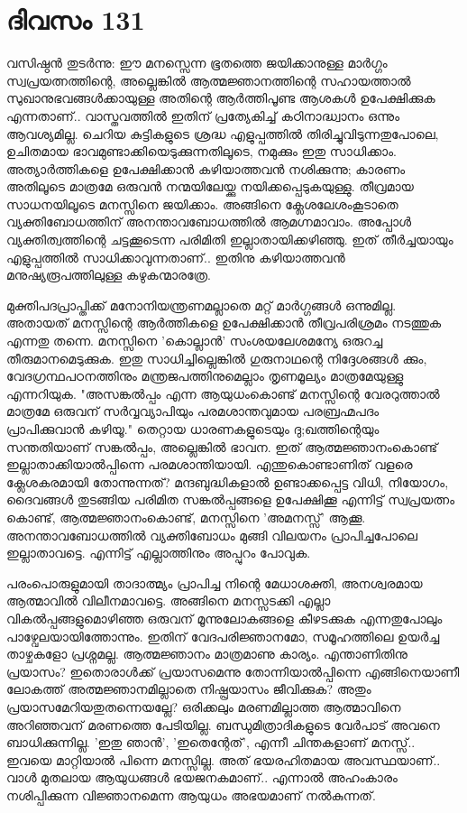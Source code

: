 \newpage
\section{ദിവസം 131}


വസിഷ്ഠന്‍ തുടര്‍ന്നു: ഈ മനസ്സെന്ന ഭൂതത്തെ ജയിക്കാനുള്ള മാര്‍ഗ്ഗം സ്വപ്രയത്നത്തിന്റെ, അല്ലെങ്കില്‍ ആത്മജ്ഞാനത്തിന്റെ സഹായത്താല്‍ സുഖാനുഭവങ്ങള്‍ക്കായുള്ള അതിന്റെ ആര്‍ത്തിപൂണ്ട  ആശകള്‍ ഉപേക്ഷിക്കുക എന്നതാണ്‌.. വാസ്തവത്തില്‍ ഇതിന്‌ പ്രത്യേകിച്ച്‌ കഠിനാദ്ധ്വാനം ഒന്നും ആവശ്യമില്ല. ചെറിയ കുട്ടികളുടെ ശ്രദ്ധ എളുപ്പത്തില്‍ തിരിച്ചുവിടുന്നതുപോലെ, ഉചിതമായ ഭാവമുണ്ടാക്കിയെടുക്കുന്നതിലൂടെ, നമുക്കും ഇതു സാധിക്കാം. അത്യാര്‍ത്തികളെ ഉപേക്ഷിക്കാന്‍ കഴിയാത്തവന്‍ നശിക്കുന്നു; കാരണം അതിലൂടെ മാത്രമേ ഒരുവന്‍ നന്മയിലേയ്ക്കു നയിക്കപ്പെടുകയുള്ളു. തീവ്രമായ സാധനയിലൂടെ മനസ്സിനെ ജയിക്കാം. അങ്ങിനെ ക്ലേശലേശംകൂടാതെ വ്യക്തിബോധത്തിന്‌ അനന്താവബോധത്തില്‍ ആമഗ്നമാവാം. അപ്പോള്‍ വ്യക്തിത്വത്തിന്റെ ചട്ടക്കൂടെന്ന പരിമിതി ഇല്ലാതായിക്കഴിഞ്ഞു. ഇത്‌ തീര്‍ച്ചയായും എളുപ്പത്തില്‍ സാധിക്കാവുന്നതാണ്‌.. ഇതിനു കഴിയാത്തവന്‍ മനുഷ്യരൂപത്തിലുള്ള കഴുകന്മാരത്രേ.

മുക്തിപദപ്രാപ്തിക്ക്‌ മനോനിയന്ത്രണമല്ലാതെ മറ്റ്‌ മാര്‍ഗ്ഗങ്ങള്‍ ഒന്നുമില്ല. അതായത്‌ മനസ്സിന്റെ ആര്‍ത്തികളെ ഉപേക്ഷിക്കാന്‍ തീവ്രപരിശ്രമം നടത്തുക എന്നതു തന്നെ. മനസ്സിനെ 'കൊല്ലാന്‍' സംശയലേശമന്യേ ഒരുറച്ച തീരുമാനമെടുക്കുക. ഇതു സാധിച്ചില്ലെങ്കില്‍ ഗുരുനാഥന്റെ നിദ്ദേശങ്ങള്‍ ക്കും, വേദഗ്രന്ഥപഠനത്തിനും മന്ത്രജപത്തിനുമെല്ലാം തൃണമൂല്യം മാത്രമേയുള്ളു എന്നറിയുക. "അസങ്കല്‍പ്പം എന്ന ആയുധംകൊണ്ട്‌ മനസ്സിന്റെ വേരറുത്താല്‍ മാത്രമേ ഒരുവന്‌ സര്‍വ്വവ്യാപിയും പരമശാന്തവുമായ പരബ്രഹ്മപദം പ്രാപിക്കുവാന്‍ കഴിയൂ." തെറ്റായ ധാരണകളുടെയും ദു;ഖത്തിന്റെയും സന്തതിയാണ്‌ സങ്കല്‍പ്പം, അല്ലെങ്കില്‍ ഭാവന. ഇത്‌ ആത്മജ്ഞാനംകൊണ്ട്‌ ഇല്ലാതാക്കിയാല്‍പ്പിന്നെ പരമശാന്തിയായി. എന്തുകൊണ്ടാണിത്‌ വളരെ ക്ലേശകരമായി തോന്നുന്നത്‌? മന്ദബുദ്ധികളാല്‍ ഉണ്ടാക്കപ്പെട്ട വിധി, നിയോഗം, ദൈവങ്ങള്‍ തുടങ്ങിയ പരിമിത സങ്കല്‍പ്പങ്ങളെ ഉപേക്ഷിക്കൂ എന്നിട്ട്‌ സ്വപ്രയത്നം കൊണ്ട്‌, ആത്മജ്ഞാനംകൊണ്ട്‌, മനസ്സിനെ 'അമനസ്സ്‌' ആക്കൂ. അനന്താവബോധത്തില്‍ വ്യക്തിബോധം മുങ്ങി വിലയനം  പ്രാപിച്ചപോലെ  ഇല്ലാതാവട്ടെ. എന്നിട്ട്‌ എല്ലാത്തിനും അപ്പുറം പോവുക.

പരംപൊരുളുമായി താദാത്മ്യം പ്രാപിച്ച നിന്റെ മേധാശക്തി, അനശ്വരമായ ആത്മാവില്‍ വിലീനമാവട്ടെ. അങ്ങിനെ മനസ്സടക്കി എല്ലാ വികല്‍പ്പങ്ങളുമൊഴിഞ്ഞ ഒരുവന്‌ മൂന്നുലോകങ്ങളെ കീഴടക്കുക എന്നതുപോലും പാഴ്വേലയായിത്തോന്നും. ഇതിന്‌ വേദപരിജ്ഞാനമോ, സമൂഹത്തിലെ ഉയര്‍ച്ച താഴ്ചകളോ പ്രശ്നമല്ല. ആത്മജ്ഞാനം മാത്രമാണു കാര്യം. എന്താണിതിനു പ്രയാസം? ഇതൊരാള്‍ക്ക്‌ പ്രയാസമെന്നു തോന്നിയാല്‍പ്പിന്നെ  എങ്ങിനെയാണീ ലോകത്ത്‌ അത്മജ്ഞാനമില്ലാതെ നിഷ്പ്രയാസം ജീവിക്കുക? അതും പ്രയാസമേറിയതുതന്നെയല്ലേ? ഒരിക്കലും മരണമില്ലാത്ത ആത്മാവിനെ അറിഞ്ഞവന്‌ മരണത്തെ പേടിയില്ല. ബന്ധുമിത്രാദികളുടെ വേര്‍പാട്‌ അവനെ ബാധിക്കുന്നില്ല. 'ഇതു ഞാന്‍', 'ഇതെന്റേത്‌', എന്നീ ചിന്തകളാണ്‌ മനസ്സ്‌.. ഇവയെ മാറ്റിയാല്‍ പിന്നെ മനസ്സില്ല. അത്‌ ഭയരഹിതമായ അവസ്ഥയാണ്‌.. വാള്‍ മുതലായ ആയുധങ്ങള്‍ ഭയജനകമാണ്‌.. എന്നാല്‍ അഹംകാരം നശിപ്പിക്കുന്ന വിജ്ഞാനമെന്ന ആയുധം അഭയമാണ്‌ നല്‍കുന്നത്‌.
